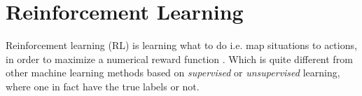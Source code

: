 \documentclass{kththesis}
\theoremstyle{definition}
\begin{document}

    


\section{Reinforcement Learning}
Reinforcement learning (RL) is learning what to do i.e. map situations to actions, in order to maximize a numerical reward function \parencite{sutton1998reinforcement}. Which is quite different from other machine learning methods based on \textit{supervised} or \textit{unsupervised} learning, where one in fact have the true labels or not.
\end{document}
